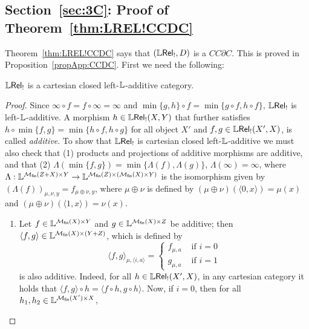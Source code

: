 



\subsection{Section~\ref{sec:3C}: Proof of Theorem~\ref{thm:LREL!CCDC}}

Theorem~\ref{thm:LREL!CCDC} says that $(\mathbb{L} \mathsf{Rel}_!,D)$ is a $CC\partial C$.
This is proved in Proposition~\ref{propApp:CCDC}.
First we need the following:

\begin{proposition}
$\mathbb{L} \mathsf{Rel}_!$ is a cartesian closed left-$\mathbb{L}$-additive category.
\end{proposition}
\begin{proof} 
Since $\infty \circ f= f\circ \infty=\infty$ and $\min\{g,h\}\circ f= \min\{g\circ f, h\circ f \}$, $\mathbb{L} \mathsf{Rel}_!$ is {left-$\mathbb{L}$-additive}.
A morphism $h\in \mathbb{L} \mathsf{Rel}_!(X,Y)$ that further satisfies $h\circ \min\{f,g\}=\min\{h\circ f, h\circ g\}$ for all object $X'$ and $f,g\in \mathbb{L} \mathsf{Rel}_!(X',X)$, is called \emph{additive}.
To show that $\mathbb{L} \mathsf{Rel}_!$ is cartesian closed left-$\mathbb{L}$-additive we must also check that (1) products and projections of additive morphisms are additive, and that (2) $\Lambda(\min\{f,g\})=\min\{\Lambda(f),\Lambda(g)\}$, $\Lambda(\infty)=\infty$, where $\Lambda:\mathbb{L}^{\mathcal{M}_{\mathsf{fin}}(Z+X)\times Y}\to \mathbb{L}^{\mathcal{M}_{\mathsf{fin}}(Z)\times( \mathcal{M}_{\mathsf{fin}}(X)\times Y)}$ is the isomorphism given by
$(\Lambda(f))_{\mu,\nu,y}= f_{\mu\oplus\nu,y}$, where 
 $\mu\oplus\nu$ is defined by $(\mu\oplus\nu)(\langle 0,x\rangle)=\mu(x)$ and $(\mu\oplus \nu)(\langle 1,x\rangle)=\nu(x)$.
	\begin{enumerate}
	\item  Let $f\in \mathbb{L}^{\mathcal{M}_{\mathsf{fin}}(X)\times Y}$ and $g\in \mathbb{L}^{\mathcal{M}_{\mathsf{fin}}(X)\times Z}$ be additive; then $\langle f,g\rangle \in \mathbb{L}^{\mathcal{M}_{\mathsf{fin}}(X)\times (Y+Z)}$, which is defined by 
	$$
	\langle f,g\rangle_{\mu,\langle i,a\rangle}= \begin{cases}
	f_{\mu,a} & \text{ if }i=0\\
	g_{\mu,a} & \text{ if }i=1
	\end{cases}
	$$
	is also additive. Indeed, for all $h\in \mathbb{L} \mathsf{Rel}_!(X',X)$, 
	in any cartesian category it holds that $\langle f,g\rangle \circ h=\langle f\circ h, g\circ h\rangle$. Now, 
		if $i=0$, then for all $h_{1},h_{2}\in \mathbb{L}^{\mathcal{M}_{\mathsf{fin}}(X')\times X}$, 

\end{enumerate}
\end{proof}
